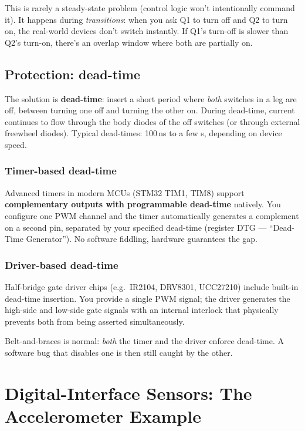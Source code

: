 \documentclass[11pt,a4paper]{article}
\begin{document}
This is rarely a steady-state problem (control logic won't intentionally
command it). It happens during \emph{transitions}: when you ask Q1 to
turn off and Q2 to turn on, the real-world devices don't switch
instantly. If Q1's turn-off is slower than Q2's turn-on, there's an
overlap window where both are partially on.

\subsection{Protection: dead-time}

The solution is \textbf{dead-time}: insert a short period where
\emph{both} switches in a leg are off, between turning one off and
turning the other on. During dead-time, current continues to flow through
the body diodes of the off switches (or through external freewheel
diodes). Typical dead-times: 100\,ns to a few \textmu s, depending on
device speed.

\subsubsection{Timer-based dead-time}

Advanced timers in modern MCUs (STM32 TIM1, TIM8) support
\textbf{complementary outputs with programmable dead-time} natively. You
configure one PWM channel and the timer automatically generates a
complement on a second pin, separated by your specified dead-time
(register DTG --- ``Dead-Time Generator''). No software fiddling, hardware
guarantees the gap.

\subsubsection{Driver-based dead-time}

Half-bridge gate driver chips (e.g.\ IR2104, DRV8301, UCC27210) include
built-in dead-time insertion. You provide a single PWM signal; the
driver generates the high-side and low-side gate signals with an
internal interlock that physically prevents both from being asserted
simultaneously.

\begin{keyidea}
Belt-and-braces is normal: \emph{both} the timer and the driver enforce
dead-time. A software bug that disables one is then still caught by the
other.
\end{keyidea}

\section{Digital-Interface Sensors: The Accelerometer Example}
\end{document}
